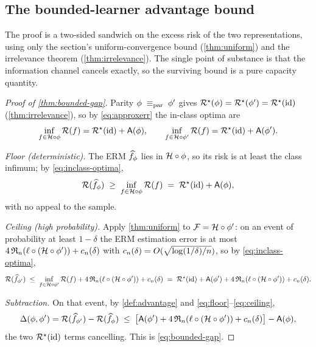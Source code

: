 \subsection{The bounded-learner advantage bound}
\label{app:bounded-gap}

The proof is a two-sided sandwich on the excess risk of the two representations,
using only the section's uniform-convergence bound (\cref{thm:uniform}) and the
irrelevance theorem (\cref{thm:irrelevance}). The single point of substance is
that the information channel cancels exactly, so the surviving bound is a pure
capacity quantity.

\begin{proof}[Proof of \cref{thm:bounded-gap}]
Parity $\phi\;\equiv_{\mathrm{par}}\;\phi'$ gives
$\mathcal{R}^{\star}(\phi)=\mathcal{R}^{\star}(\phi')=\mathcal{R}^{\star}(\mathrm{id})$
(\cref{thm:irrelevance}), so by \eqref{eq:approxerr} the in-class optima are
\begin{equation}
  \label{eq:inclass-optima}
  \inf_{f\in\mathcal{H}\circ\phi}\mathcal{R}(f)=\mathcal{R}^{\star}(\mathrm{id})+\mathsf{A}(\phi),
  \qquad
  \inf_{f\in\mathcal{H}\circ\phi'}\mathcal{R}(f)=\mathcal{R}^{\star}(\mathrm{id})+\mathsf{A}(\phi').
\end{equation}

\emph{Floor (deterministic).} The ERM $\widehat f_{\phi}$ lies in
$\mathcal{H}\circ\phi$, so its risk is at least the class infimum; by
\eqref{eq:inclass-optima},
\begin{equation}
  \label{eq:floor}
  \mathcal{R}(\widehat f_{\phi})\;\ge\;\inf_{f\in\mathcal{H}\circ\phi}\mathcal{R}(f)
  \;=\;\mathcal{R}^{\star}(\mathrm{id})+\mathsf{A}(\phi),
\end{equation}
with no appeal to the sample.

\emph{Ceiling (high probability).} Apply \cref{thm:uniform} to
$\mathcal F=\mathcal{H}\circ\phi'$: on an event of probability at least $1-\delta$
the ERM estimation error is at most
$4\,\mathfrak{R}_n(\ell\circ(\mathcal{H}\circ\phi'))+c_n(\delta)$ with
$c_n(\delta)=O(\sqrt{\log(1/\delta)/n})$, so by
\eqref{eq:inclass-optima},
\begin{equation}
  \label{eq:ceiling}
  \mathcal{R}(\widehat f_{\phi'})\;\le\;\inf_{f\in\mathcal{H}\circ\phi'}\mathcal{R}(f)
   +4\,\mathfrak{R}_n(\ell\circ(\mathcal{H}\circ\phi'))+c_n(\delta)
  \;=\;\mathcal{R}^{\star}(\mathrm{id})+\mathsf{A}(\phi')
   +4\,\mathfrak{R}_n(\ell\circ(\mathcal{H}\circ\phi'))+c_n(\delta).
\end{equation}

\emph{Subtraction.} On that event, by \cref{def:advantage} and
\eqref{eq:floor}--\eqref{eq:ceiling},
\[
  \Delta(\phi,\phi')
  =\mathcal{R}(\widehat f_{\phi'})-\mathcal{R}(\widehat f_{\phi})
  \;\le\;\big[\mathsf{A}(\phi')+4\,\mathfrak{R}_n(\ell\circ(\mathcal{H}\circ\phi'))
       +c_n(\delta)\big]-\mathsf{A}(\phi),
\]
the two $\mathcal{R}^{\star}(\mathrm{id})$ terms cancelling. This is
\eqref{eq:bounded-gap}.


\end{proof}
